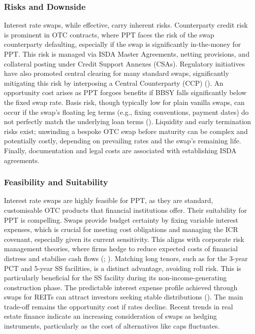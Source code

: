 \documentclass[11pt, a4paper, british]{article}
\begin{document}
\subsubsection{Risks and Downside}
Interest rate swaps, while effective, carry inherent risks. Counterparty credit risk is prominent in OTC contracts, where PPT faces the risk of the swap counterparty defaulting, especially if the swap is significantly in-the-money for PPT. This risk is managed via ISDA Master Agreements, netting provisions, and collateral posting under Credit Support Annexes (CSAs). Regulatory initiatives have also promoted central clearing for many standard swaps, significantly mitigating this risk by interposing a Central Counterparty (CCP) (\cite{mv}). An opportunity cost arises as PPT forgoes benefits if BBSY falls significantly below the fixed swap rate. Basis risk, though typically low for plain vanilla swaps, can occur if the swap's floating leg terms (e.g., fixing conventions, payment dates) do not perfectly match the underlying loan terms (\cite{ds}). Liquidity and early termination risks exist; unwinding a bespoke OTC swap before maturity can be complex and potentially costly, depending on prevailing rates and the swap's remaining life. Finally, documentation and legal costs are associated with establishing ISDA agreements.

\subsubsection{Feasibility and Suitability}
Interest rate swaps are highly feasible for PPT, as they are standard, customisable OTC products that financial institutions offer. Their suitability for PPT is compelling. Swaps provide budget certainty by fixing variable interest expenses, which is crucial for meeting cost obligations and managing the ICR covenant, especially given its current sensitivity. This aligns with corporate risk management theories, where firms hedge to reduce expected costs of financial distress and stabilise cash flows (\cite{ss}; \cite{fss}). Matching long tenors, such as for the 3-year PCT and 5-year SS facilities, is a distinct advantage, avoiding roll risk. This is particularly beneficial for the SS facility during its non-income-generating construction phase. The predictable interest expense profile achieved through swaps for REITs can attract investors seeking stable distributions (\cite{bk}). The main trade-off remains the opportunity cost if rates decline. Recent trends in real estate finance indicate an increasing consideration of swaps as hedging instruments, particularly as the cost of alternatives like caps fluctuates.
\end{document}
